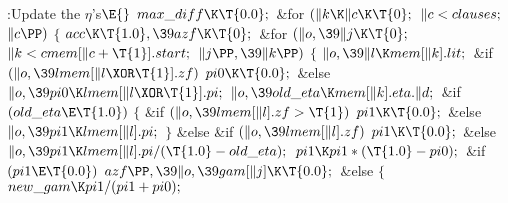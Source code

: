 \Y\B\4:Update the $\eta$'s\X${}\E{}$\6
$\\{max\_diff}\K\T{0.0};{}$\6
\&{for} ${}(\|k\K\|c\K\T{0};{}$ ${}\|c<\\{clauses};{}$ ${}\|c\PP){}$\5
${}\{{}$\1\6
${}\\{acc}\K\T{1.0},\39\\{azf}\K\T{0};{}$\6
\&{for} ${}(\|o,\39\|j\K\T{0};{}$ ${}\|k<\\{cmem}[\|c+\T{1}].\\{start};{}$ ${}%
\|j\PP,\39\|k\PP){}$\5
${}\{{}$\1\6
${}\|o,\39\|l\K\\{mem}[\|k].\\{lit};{}$\6
\&{if} ${}(\|o,\39\\{lmem}[\|l\XOR\T{1}].\\{zf}){}$\1\5
${}\\{pi0}\K\T{0.0};{}$\2\6
\&{else}\1\5
${}\|o,\39\\{pi0}\K\\{lmem}[\|l\XOR\T{1}].\\{pi};{}$\2\6
${}\|o,\39\\{old\_eta}\K\\{mem}[\|k].\\{eta}.\|d;{}$\6
\&{if} ${}(\\{old\_eta}\E\T{1.0}){}$\5
${}\{{}$\1\6
\&{if} ${}(\|o,\39\\{lmem}[\|l].\\{zf}>\T{1}){}$\1\5
${}\\{pi1}\K\T{0.0};{}$\2\6
\&{else}\1\5
${}\|o,\39\\{pi1}\K\\{lmem}[\|l].\\{pi};{}$\2\6
\4${}\}{}$\5
\2\&{else} \&{if} ${}(\|o,\39\\{lmem}[\|l].\\{zf}){}$\1\5
${}\\{pi1}\K\T{0.0};{}$\2\6
\&{else}\1\5
${}\|o,\39\\{pi1}\K\\{lmem}[\|l].\\{pi}/(\T{1.0}-\\{old\_eta});{}$\2\6
${}\\{pi1}\K\\{pi1}*(\T{1.0}-\\{pi0});{}$\6
\&{if} ${}(\\{pi1}\E\T{0.0}){}$\1\5
${}\\{azf}\PP,\39\|o,\39\\{gam}[\|j]\K\T{0.0};{}$\2\6
\&{else}\5
${}\{{}$\1\6
${}\\{new\_gam}\K\\{pi1}/(\\{pi1}+\\{pi0});{}$\6
